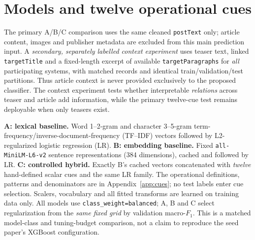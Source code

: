 \documentclass[11pt]{article}
\newcommand{\mF}{macro-$F_1$}
\begin{document}
\section{Models and twelve operational cues}
The primary A/B/C comparison uses the same cleaned \texttt{postText} only; article content, images and publisher metadata are excluded from this main prediction input. A \emph{secondary, separately labelled context experiment} uses teaser text, linked \texttt{targetTitle} and a fixed-length excerpt of available \texttt{targetParagraphs} for \emph{all} participating systems, with matched records and identical train/validation/test partitions. Thus article context is never provided exclusively to the proposed classifier. The context experiment tests whether interpretable \emph{relations} across teaser and article add information, while the primary twelve-cue test remains deployable when only teasers exist.

\textbf{A: lexical baseline.} Word 1--2-gram and character 3--5-gram term-frequency/inverse-document-frequency (TF--IDF) vectors followed by L2-regularized logistic regression (LR). \textbf{B: embedding baseline.} Fixed \texttt{all-MiniLM-L6-v2} sentence representations (384 dimensions), cached and followed by LR. \textbf{C: controlled hybrid.} Exactly B's cached vectors concatenated with \emph{twelve} hand-defined scalar cues and the same LR family. The operational definitions, patterns and denominators are in Appendix~\ref{app:cues}; no test labels enter cue selection. Scalers, vocabulary and all fitted transforms are learned on training data only. All models use \texttt{class\_weight=balanced}; A, B and C select regularization from the \emph{same fixed grid} by validation \mF{}. This is a matched model-class and tuning-budget comparison, not a claim to reproduce the seed paper's XGBoost configuration.
\end{document}
